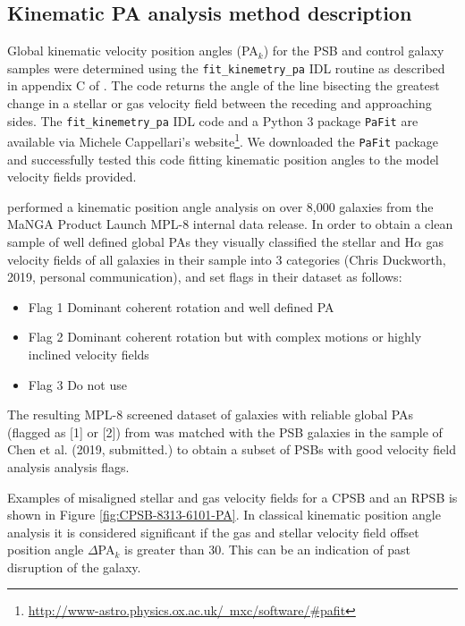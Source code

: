 \subsection{Kinematic PA analysis method description}
\label{sec:kinemetry-analysis-method-description}
Global kinematic velocity position angles (PA$_{k}$) for the PSB and control galaxy samples were determined using the \texttt{fit\_kinemetry\_pa} IDL routine as described in appendix C of \cite{2006MNRAS.366..787K}. The code returns the angle of the line bisecting the greatest change in a stellar or gas velocity field between the receding and approaching sides. The \texttt{fit\_kinemetry\_pa} IDL code and a Python 3 package \texttt{PaFit} are available via Michele Cappellari's website\footnote{\href{http://www-astro.physics.ox.ac.uk/~mxc/software/\#pafit}{http://www-astro.physics.ox.ac.uk/~mxc/software/\#pafit}}. We downloaded the \texttt{PaFit} package and successfully tested this code fitting kinematic position angles to the model velocity fields provided. 


\cite{2019MNRAS.483..172D} performed a kinematic position angle analysis on over 8,000 galaxies from the MaNGA Product Launch MPL-8 internal data release. In order to obtain a clean sample of well defined global PAs they visually classified the stellar and H$\alpha$ gas velocity fields of all galaxies in their sample into 3 categories (Chris Duckworth, 2019, personal communication), and set flags in their dataset as follows:

\begin{itemize}
    \item {Flag 1}  Dominant coherent rotation and well defined PA
    \item {Flag 2}  Dominant coherent rotation but with complex motions or highly inclined velocity fields 
    \item {Flag 3}  Do not use
\end{itemize}

The resulting MPL-8 screened dataset of galaxies with reliable global PAs (flagged as [1] or [2]) from \cite{2019MNRAS.483..172D} was matched with the PSB galaxies in the sample of Chen et al. (2019, submitted.) to obtain a subset of PSBs with good velocity field analysis analysis flags.

Examples of misaligned stellar and gas velocity fields for a CPSB and an RPSB is shown in Figure \ref{fig:CPSB-8313-6101-PA}. In classical kinematic position angle analysis it is considered significant if the gas and stellar velocity field offset position angle $\Delta$PA$_{k}$ is greater than 30\textdegree. This can be an indication of past disruption of the galaxy.


